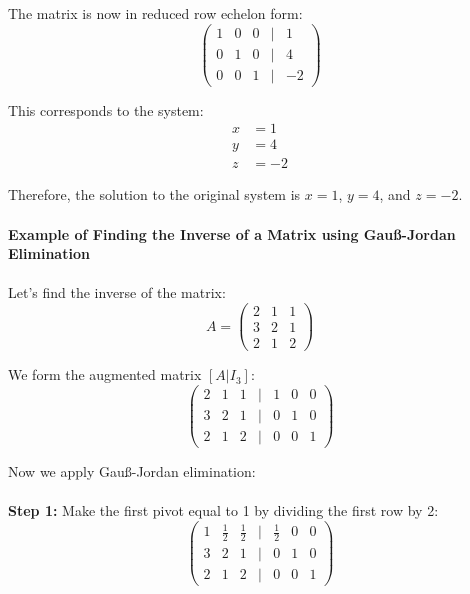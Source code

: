 The matrix is now in reduced row echelon form:
\begin{equation*}
\begin{pmatrix}
1 & 0 & 0 & | & 1 \\
0 & 1 & 0 & | & 4 \\
0 & 0 & 1 & | & -2
\end{pmatrix}
\end{equation*}

This corresponds to the system:
\begin{align*}
x &= 1 \\
y &= 4 \\
z &= -2
\end{align*}

Therefore, the solution to the original system is \(x = 1\), \(y = 4\), and \(z = -2\).
\\\\
\textbf{Example of Finding the Inverse of a Matrix using Gauß-Jordan Elimination}
\\\\
Let's find the inverse of the matrix:
\begin{equation*}
A = 
\begin{pmatrix}
2 & 1 & 1 \\
3 & 2 & 1 \\
2 & 1 & 2
\end{pmatrix}
\end{equation*}

We form the augmented matrix \([A|I_3]\):
\begin{equation*}
\begin{pmatrix}
2 & 1 & 1 & | & 1 & 0 & 0 \\
3 & 2 & 1 & | & 0 & 1 & 0 \\
2 & 1 & 2 & | & 0 & 0 & 1
\end{pmatrix}
\end{equation*}

Now we apply Gauß-Jordan elimination:
\\\\
\textbf{Step 1:} Make the first pivot equal to 1 by dividing the first row by 2:
\begin{equation*}
\begin{pmatrix}
1 & \frac{1}{2} & \frac{1}{2} & | & \frac{1}{2} & 0 & 0 \\
3 & 2 & 1 & | & 0 & 1 & 0 \\
2 & 1 & 2 & | & 0 & 0 & 1
\end{pmatrix}
\end{equation*}

